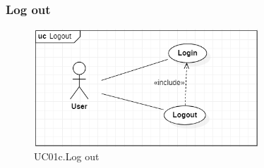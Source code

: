 \documentclass[../thesis.tex]{subfiles}
\begin{document}
\subsubsection{Log out}
\begin{figure}[H]
    \centering
    \includegraphics[width=0.75\textwidth]{images/UCD_Logout.png}
    \caption{UC01c.Log out}
    \label{fig:UCD-logout}
\end{figure}
\end{document}

